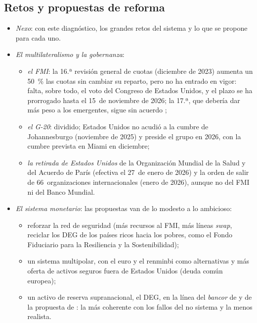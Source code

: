 \documentclass[11pt]{article}
\begin{document}
\subsection{Retos y propuestas de reforma}\label{sec:reformas}

\begin{itemize}
\item \emph{Nexo}: con este diagnóstico, los grandes retos del sistema y lo que se propone para cada uno.
\item \emph{El multilateralismo y la gobernanza}:
  \begin{itemize}
  \item \emph{el FMI}: la 16.ª revisión general de cuotas (diciembre de 2023) aumenta un 50~\% las cuotas sin cambiar su reparto, pero no ha entrado en vigor: falta, sobre todo, el voto del Congreso de Estados Unidos, y el plazo se ha prorrogado hasta el 15~de noviembre de 2026; la 17.ª, que debería dar más peso a los emergentes, sigue sin acuerdo\nocite{FMI2026PlazoCuotas} ;
  \item \emph{el G-20}: dividido; Estados Unidos no acudió a la cumbre de Johannesburgo (noviembre de 2025) y preside el grupo en 2026, con la cumbre prevista en Miami en diciembre\nocite{G20Johannesburgo2025,G20RG2026Miami};
  \item \emph{la retirada de Estados Unidos} de la Organización Mundial de la Salud y del Acuerdo de París (efectiva el 27~de enero de 2026) y la orden de salir de 66~organizaciones internacionales (enero de 2026), aunque no del FMI ni del Banco Mundial\nocite{CasaBlanca2026Organismos,ONU2025RetiradaParis}.
  \end{itemize}
\item \emph{El sistema monetario}: las propuestas van de lo modesto a lo ambicioso\nocite{FarhiGourinchasRey2011}:
  \begin{itemize}
  \item reforzar la red de seguridad (más recursos al FMI, más líneas \emph{swap}, reciclar los DEG de los países ricos hacia los pobres, como el Fondo Fiduciario para la Resiliencia y la Sostenibilidad);
  \item un sistema multipolar, con el euro y el renminbi como alternativas y más oferta de activos seguros fuera de Estados Unidos (deuda común europea);
  \item un activo de reserva supranacional, el DEG, en la línea del \emph{bancor} de  y de la propuesta de : la más coherente con los fallos del no sistema y la menos realista.

\end{itemize}
\end{itemize}
\end{document}

